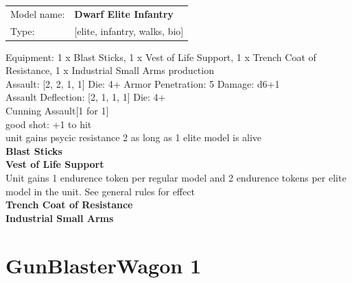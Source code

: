 \begin{tabular}{ll}
Model name: & {\bf Dwarf Elite Infantry } \\
Type: & [elite, infantry, walks, bio] \\
\end{tabular}

Equipment: 1 x Blast Sticks, 1 x Vest of Life Support, 1 x Trench Coat of Resistance, 1 x Industrial Small Arms production \\

Assault: [2, 2, 1, 1] Die: 4+ Armor Penetration: 5 Damage: d6+1 \\
Assault Deflection: [2, 1, 1, 1] Die: 4+\\
\indent Cunning Assault[1 for 1]\\ 

good shot: +1 to hit\\ 
unit gains psycic resistance 2 as long as 1 elite model is alive\\ 


{\bf Blast Sticks } \\






{\bf Vest of Life Support } \\

Unit gains 1 endurence token per regular model  and 2 endurence tokens per elite model in the unit. See general rules for effect\\ 





{\bf Trench Coat of Resistance } \\



{\bf Industrial Small Arms } \\






 















\clearpage

\section{ GunBlasterWagon 1 }

